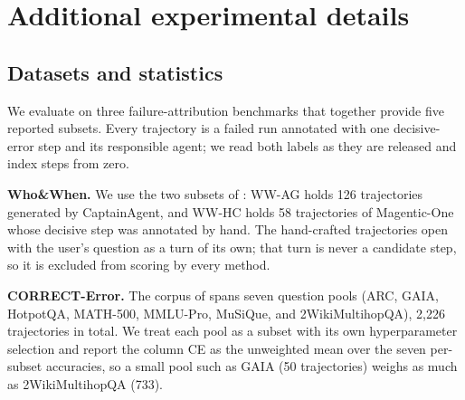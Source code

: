 
\section{Additional experimental details}
\label{app:details}

\subsection{Datasets and statistics}
\label{app:datasets}

We evaluate on three failure-attribution benchmarks that together provide five
reported subsets. Every trajectory is a failed run annotated with one decisive-error
step and its responsible agent; we read both labels as they are released and index
steps from zero.

\textbf{Who\&When.}
We use the two subsets of \citet{whoandwhen}: \textsc{WW-AG} holds 126 trajectories
generated by CaptainAgent, and \textsc{WW-HC} holds 58 trajectories of Magentic-One
whose decisive step was annotated by hand. The hand-crafted trajectories open with the
user's question as a turn of its own; that turn is never a candidate step, so it is
excluded from scoring by every method.

\textbf{CORRECT-Error.}
The corpus of \citet{correct} spans seven question pools (ARC, GAIA, HotpotQA,
MATH-500, MMLU-Pro, MuSiQue, and 2WikiMultihopQA), 2{,}226 trajectories in total. We
treat each pool as a subset with its own hyperparameter selection and report the
column \textsc{CE} as the unweighted mean over the seven per-subset accuracies, so a
small pool such as GAIA (50 trajectories) weighs as much as 2WikiMultihopQA (733).

